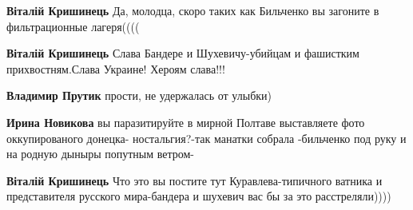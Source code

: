 \begin{itemize}
\begin{itemize}
 
\textbf{Віталій Кришинець} Да, молодца, скоро таких как Бильченко вы загоните в фильтрационные лагеря((((

 
\textbf{Віталій Кришинець} Слава Бандере и Шухевичу-убийцам и фашистким прихвостням.Слава Украине! Хероям слава!!!


 
\textbf{Владимир Прутик} прости, не удержалась от улыбки)

 
\textbf{Ирина Новикова} вы паразитируйте в мирной Полтаве выставляете фото оккупированого донецка- ностальгия?-так манатки собрала -бильченко под руку и на родную дыныры попутным ветром-

 
\textbf{Віталій Кришинець} Что это вы постите тут Куравлева-типичного ватника и представителя русского мира-бандера и шухевич вас бы за это расстреляли))))

 

\end{itemize}
\end{itemize}
